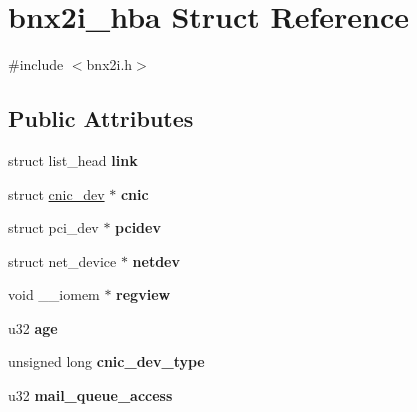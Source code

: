 \hypertarget{structbnx2i__hba}{
\section{bnx2i\_\-hba Struct Reference}
\label{structbnx2i__hba}
}


{\ttfamily \#include $<$bnx2i.h$>$}

\subsection*{Public Attributes}
\begin{DoxyCompactItemize}
\item 
\hypertarget{structbnx2i__hba_a22787a780ec647bb755062922c822deb}{
struct list\_\-head {\bfseries link}}
\label{structbnx2i__hba_a22787a780ec647bb755062922c822deb}

\item 
\hypertarget{structbnx2i__hba_a3790c7120f71cd3c056675be66bd4183}{
struct \hyperlink{structcnic__dev}{cnic\_\-dev} $\ast$ {\bfseries cnic}}
\label{structbnx2i__hba_a3790c7120f71cd3c056675be66bd4183}

\item 
\hypertarget{structbnx2i__hba_aec310357dfd95feedbbf5ceb03b2c3b9}{
struct pci\_\-dev $\ast$ {\bfseries pcidev}}
\label{structbnx2i__hba_aec310357dfd95feedbbf5ceb03b2c3b9}

\item 
\hypertarget{structbnx2i__hba_a02b766761530b1022e9f54f40073eab3}{
struct net\_\-device $\ast$ {\bfseries netdev}}
\label{structbnx2i__hba_a02b766761530b1022e9f54f40073eab3}

\item 
\hypertarget{structbnx2i__hba_aff08b710a6c0651e5e569f163d7768bf}{
void \_\-\_\-iomem $\ast$ {\bfseries regview}}
\label{structbnx2i__hba_aff08b710a6c0651e5e569f163d7768bf}

\item 
\hypertarget{structbnx2i__hba_a7c84171c3c88a5a8a97601b5c30513dc}{
u32 {\bfseries age}}
\label{structbnx2i__hba_a7c84171c3c88a5a8a97601b5c30513dc}

\item 
\hypertarget{structbnx2i__hba_aea546c3a1f5e8fe258638995766cbea8}{
unsigned long {\bfseries cnic\_\-dev\_\-type}}
\label{structbnx2i__hba_aea546c3a1f5e8fe258638995766cbea8}

\item 
\hypertarget{structbnx2i__hba_a58623caf96f9484d0257a0e17a276255}{
u32 {\bfseries mail\_\-queue\_\-access}}
\label{structbnx2i__hba_a58623caf96f9484d0257a0e17a276255}


\end{DoxyCompactItemize}

